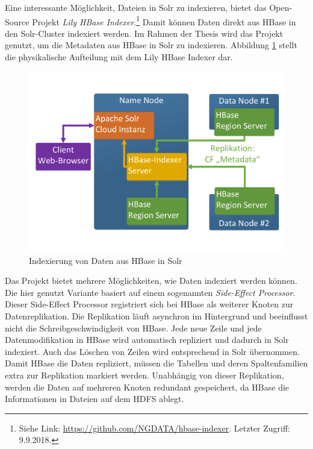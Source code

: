 \noindent
Eine interessante Möglichkeit, Dateien in Solr zu indexieren, bietet das Open-Source Projekt \textit{Lily HBase Indexer}.\footnote{Siehe Link: \url{https://github.com/NGDATA/hbase-indexer}. Letzter Zugriff: 9.9.2018.} Damit können Daten direkt aus HBase in den Solr-Cluster indexiert werden. 
Im Rahmen der Thesis wird das Projekt genutzt, um die Metadaten aus HBase in Solr zu indexieren. Abbildung \ref{fig:hbase_solr_indexing} stellt die physikalische Aufteilung mit dem Lily HBase Indexer dar.\\
\begin{figure}[ht]
  \centering
  \includegraphics[width=\textwidth]{./resource/hbase_solr_indexierung.pdf}
  \caption{Indexierung von Daten aus HBase in Solr}
  \label{fig:hbase_solr_indexing}
\end{figure}

\noindent
Das Projekt bietet mehrere Möglichkeiten, wie Daten indexiert werden können. Die hier genutzt Variante basiert auf einem sogenannten \textit{Side-Effect Processor}.\cite{hbase_sep} 
Dieser Side-Effect Processor registriert sich bei HBase als weiterer Knoten zur Datenreplikation.
Die Replikation läuft asynchron im Hintergrund und beeinflusst nicht die Schreibgeschwindigkeit von HBase. Jede neue Zeile und jede Datenmodifikation in HBase wird automatisch repliziert und dadurch in Solr indexiert.
Auch das Löschen von Zeilen wird entsprechend in Solr übernommen. Damit HBase die Daten repliziert, müssen die Tabellen und deren Spaltenfamilien extra zur Replikation markiert werden. Unabhängig von dieser Replikation, werden die Daten auf mehreren Knoten redundant gespeichert, da HBase die Informationen in Dateien auf dem HDFS ablegt.\\

